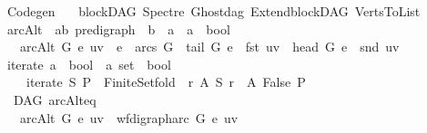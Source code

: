 %
\begin{isabellebody}%
%
%
\isadelimtheory
\isanewline
\isanewline
\isanewline
%
\endisadelimtheory
%
\isatagtheory
{}\isamarkupfalse%
\ Codegen\isanewline
\ \ \ blockDAG\ Spectre\ Ghostdag\ Extend{\isacharunderscore}{\kern0pt}blockDAG\ Verts{\isacharunderscore}{\kern0pt}To{\isacharunderscore}{\kern0pt}List\isanewline
{}%
\endisatagtheory
{\isafoldtheory}%
%
\isadelimtheory
%
\endisadelimtheory
%
\isadelimdocument
%
\endisadelimdocument
%
\isatagdocument
%
\isamarkuptrue%
%
\endisatagdocument
{\isafolddocument}%
%
\isadelimdocument
%
\endisadelimdocument
{}\isamarkupfalse%
\ arcAlt{\isacharcolon}{\kern0pt}{\isacharcolon}{\kern0pt}\ \ {\isachardoublequoteopen}{\isacharparenleft}{\kern0pt}{\isacharprime}{\kern0pt}a{\isacharcomma}{\kern0pt}{\isacharprime}{\kern0pt}b{\isacharparenright}{\kern0pt}\ pre{\isacharunderscore}{\kern0pt}digraph\ {\isasymRightarrow}\ {\isacharprime}{\kern0pt}b\ {\isasymRightarrow}\ {\isacharprime}{\kern0pt}a\ {\isasymtimes}\ {\isacharprime}{\kern0pt}a\ {\isasymRightarrow}\ bool{\isachardoublequoteclose}\isanewline
\ \ \ {\isachardoublequoteopen}arcAlt\ G\ e\ uv\ {\isacharequal}{\kern0pt}\ {\isacharparenleft}{\kern0pt}e\ {\isasymin}\ arcs\ G\ {\isasymand}\ tail\ G\ e\ {\isacharequal}{\kern0pt}\ fst\ uv\ {\isasymand}\ head\ G\ e\ {\isacharequal}{\kern0pt}\ snd\ uv{\isacharparenright}{\kern0pt}{\isachardoublequoteclose}\isanewline
\isanewline
{}\isamarkupfalse%
\ iterate{\isacharcolon}{\kern0pt}{\isacharcolon}{\kern0pt}\ {\isachardoublequoteopen}{\isacharparenleft}{\kern0pt}{\isacharprime}{\kern0pt}a\ {\isasymRightarrow}\ bool{\isacharparenright}{\kern0pt}\ {\isasymRightarrow}\ {\isacharprime}{\kern0pt}a\ set\ {\isasymRightarrow}\ bool{\isachardoublequoteclose}\isanewline
\ \ \ \ {\isachardoublequoteopen}iterate\ S\ P\ {\isacharequal}{\kern0pt}\ Finite{\isacharunderscore}{\kern0pt}Set{\isachardot}{\kern0pt}fold\ {\isacharparenleft}{\kern0pt}{\isasymlambda}\ r\ A{\isachardot}{\kern0pt}\ S\ r\ {\isasymand}\ A{\isacharparenright}{\kern0pt}\ False\ P\ {\isachardoublequoteclose}\isanewline
\isanewline
{}\isamarkupfalse%
\ {\isacharparenleft}{\kern0pt}\ DAG{\isacharparenright}{\kern0pt}\ arcAlt{\isacharunderscore}{\kern0pt}eq{\isacharcolon}{\kern0pt}\ \ \ \ \ \ \ \ \ \ \ \ \ \ \ \ \ \ \ \ \ \isanewline
\ \ \ {\isachardoublequoteopen}arcAlt\ G\ e\ uv\ {\isacharequal}{\kern0pt}\ wf{\isacharunderscore}{\kern0pt}digraph{\isachardot}{\kern0pt}arc\ G\ e\ uv{\isachardoublequoteclose}\isanewline

\end{isabellebody}
